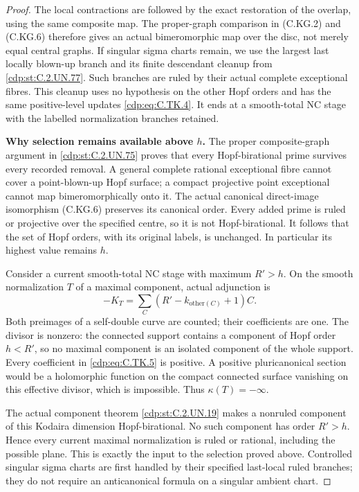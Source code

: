 \begin{proof}
The local contractions are followed by the exact
restoration of the overlap, using the same composite
map. The proper-graph comparison in (C.KG.2) and
(C.KG.6) therefore gives an actual bimeromorphic
map over the disc, not merely equal central graphs.
If singular sigma charts remain, we use the
largest last locally blown-up branch and its finite
descendant cleanup from \ref{cdp:st:C.2.UN.77}. Such branches are
ruled by their actual complete exceptional fibres.
This cleanup uses no hypothesis on the other
Hopf orders and has the same positive-level updates
\eqref{cdp:eq:C.TK.4}. It ends at a smooth-total NC stage with
the labelled normalization branches retained.

\par\medskip\noindent\textbf{Why selection remains available above \(h\).}
The proper composite-graph argument in \ref{cdp:st:C.2.UN.75} proves
that every Hopf-birational prime survives every
recorded removal. A general complete rational
exceptional fibre cannot cover a point-blown-up
Hopf surface; a compact projective point exceptional
cannot map bimeromorphically onto it. The actual
canonical direct-image isomorphism (C.KG.6) preserves
its canonical order. Every added prime is ruled or
projective over the specified centre, so it is not
Hopf-birational. It follows that the set of Hopf
orders, with its original labels, is unchanged.
In particular its highest value remains \(h\).

Consider a current smooth-total NC stage with
maximum \(R'>h\). On the smooth normalization
\(T\) of a maximal component, actual adjunction is
\[
       -K_T=\sum_C (R'-k_{\mathrm{other}(C)}+1)C.
 \tag{C.TK.5}\label{cdp:eq:C.TK.5}
\]
Both preimages of a self-double curve are counted;
their coefficients are one. The divisor is nonzero:
the connected support contains a component of Hopf
order \(h<R'\), so no maximal component is an
isolated component of the whole support. Every
coefficient in \eqref{cdp:eq:C.TK.5} is positive. A positive
pluricanonical section would be a holomorphic
function on the compact connected surface vanishing
on this effective divisor, which is impossible.
Thus \(\kappa(T)=-\infty\).

The actual component theorem \ref{cdp:st:C.2.UN.19} makes a
nonruled component of this Kodaira dimension
Hopf-birational. No such component has order
\(R'>h\). Hence every current maximal
normalization is ruled or rational, including
the possible plane. This is exactly the input
to the selection proved above. Controlled
singular sigma charts are first handled by
their specified last-local ruled branches;
they do not require an anticanonical formula
on a singular ambient chart.


\end{proof}
